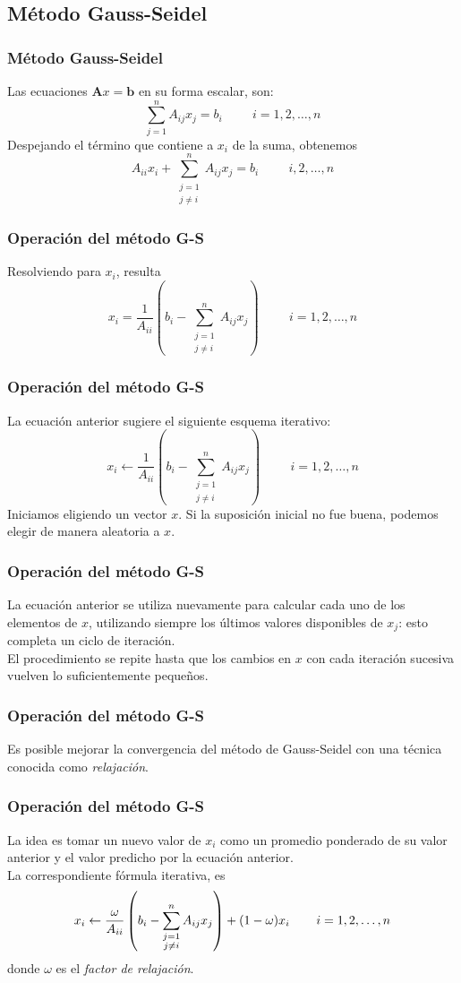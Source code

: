 \subsection{Método Gauss-Seidel}
\begin{frame}
\frametitle{Método Gauss-Seidel}
Las ecuaciones $\mathbf{A}x = \mathbf{b}$ en su forma escalar, son:
\[ \sum_{j=1}^{n} A_{ij} x_{j} = b_{i} \hspace{1cm} i=1,2,\ldots,n \]
Despejando el término que contiene a $x_{i}$ de la suma, obtenemos
\[ A_{ii} x_{i} + \sum_{\substack{j=1 \\ j \neq i}}^{n} A_{ij}x_{j} = b_{i} \hspace{1cm} i,2,\ldots,n \]
\end{frame}
\begin{frame}
\frametitle{Operación del método G-S}
Resolviendo para $x_{i}$, resulta
\[ x_{i} = \dfrac{1}{A_{ii}} \left( b_{i} - \sum_{\substack{ j=1 \\ j \neq i}}^{n} A_{ij} x_{j} \right) \hspace{1cm} i=1,2,\ldots,n \]
\end{frame}
\begin{frame}
\frametitle{Operación del método G-S}
La ecuación anterior sugiere el siguiente esquema iterativo:
\[ x_{i}\leftarrow \dfrac{1}{A_{ii}} \left( b_{i} - \sum_{\substack{ j=1 \\ j \neq i}}^{n} A_{ij} x_{j} \right) \hspace{1cm} i=1,2,\ldots,n \]
Iniciamos eligiendo un vector $x$. Si la suposición inicial no fue buena, podemos elegir de manera aleatoria a $x$.
\end{frame}
\begin{frame}
\frametitle{Operación del método G-S}
La ecuación anterior se utiliza nuevamente para calcular cada uno de los elementos de $x$, utilizando siempre los últimos valores disponibles de $x_{j}$: esto completa un ciclo de iteración.
\\
\bigskip
El procedimiento se repite hasta que los cambios en $x$ con cada iteración sucesiva vuelven lo suficientemente pequeños.
\end{frame}
\begin{frame}
\frametitle{Operación del método G-S}
Es posible mejorar la convergencia del método de Gauss-Seidel con una técnica conocida como \emph{relajación}.
\end{frame}
\begin{frame}
\frametitle{Operación del método G-S}
La idea es tomar un nuevo valor de $x_{i}$ como un promedio ponderado de su valor anterior y el valor predicho por la ecuación anterior.
\\
\bigskip
La correspondiente fórmula iterativa, es
\[  x_{i}\leftarrow \dfrac{\omega}{A_{ii}} \left( b_{i} - \sum_{\substack{ j=1 \\ j \neq i}}^{n} A_{ij} x_{j} \right) + (1 - \omega) x_{i} \hspace{0.75cm} i=1,2,\ldots,n \]
donde $\omega$ es el \emph{factor de relajación}.
\end{frame}
